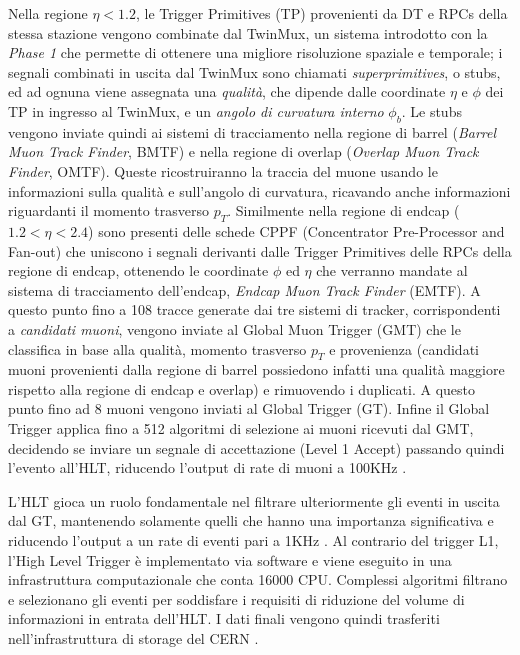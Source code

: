 Nella regione $\eta < 1.2$, le Trigger Primitives (TP) provenienti da DT e RPCs della stessa stazione vengono combinate dal TwinMux, un sistema introdotto con la \textit{Phase 1} che permette di ottenere una migliore risoluzione spaziale e temporale; i segnali combinati in uscita dal TwinMux sono chiamati \textit{superprimitives}, o stubs, ed ad ognuna viene assegnata una \textit{qualità}, che dipende dalle coordinate $\eta$ e $\phi$ dei TP in ingresso al TwinMux, e un \textit{angolo di curvatura interno} $\phi_b$. Le stubs vengono inviate quindi ai sistemi di tracciamento nella regione di barrel (\textit{Barrel Muon Track Finder}, BMTF) e nella regione di overlap (\textit{Overlap Muon Track Finder}, OMTF). Queste  ricostruiranno la traccia del muone usando le informazioni sulla qualità e sull'angolo di curvatura, ricavando anche informazioni riguardanti il momento trasverso $p_T$. \newline
Similmente nella regione di endcap ($1.2 < \eta < 2.4$) sono presenti delle schede CPPF (Concentrator Pre-Processor and Fan-out) che uniscono i segnali derivanti dalle Trigger Primitives delle RPCs della regione di endcap, ottenendo le coordinate $\phi$ ed $\eta$ che verranno mandate al sistema di tracciamento dell'endcap, \textit{Endcap Muon Track Finder} (EMTF). \newline
A questo punto fino a 108 tracce generate dai tre sistemi di tracker, corrispondenti a \textit{candidati muoni}, vengono inviate al Global Muon Trigger (GMT) che le classifica in base alla qualità, momento trasverso $p_T$ e provenienza (candidati muoni provenienti dalla regione di barrel possiedono infatti una qualità maggiore rispetto alla regione di endcap e overlap) e rimuovendo i duplicati. A questo punto fino ad 8 muoni vengono inviati al Global Trigger (GT). \newline
Infine il Global Trigger applica fino a 512 algoritmi di selezione ai muoni ricevuti dal GMT, decidendo se inviare un segnale di accettazione (Level 1 Accept) passando quindi l'evento all'HLT, riducendo l'output di rate di muoni a 100KHz \cite{CERNsummerSchool}.

L'HLT gioca un ruolo fondamentale nel filtrare ulteriormente gli eventi in uscita dal GT, mantenendo solamente quelli che hanno una importanza significativa e riducendo l'output a un rate di eventi pari a 1KHz . Al contrario del trigger L1, l'High Level Trigger è implementato via software e viene eseguito in una infrastruttura computazionale che conta 16000 CPU. \newline
Complessi algoritmi filtrano e selezionano gli eventi per soddisfare i requisiti di riduzione del volume di informazioni in entrata dell'HLT. I dati finali vengono quindi trasferiti nell'infrastruttura di storage del CERN \cite{MasterThesisNicLai}.


